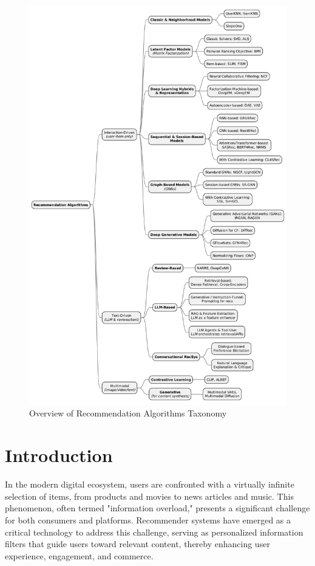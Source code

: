 \documentclass{article}
\begin{document}
    \begin{figure}[H]
        \centering
        \includegraphics[width=0.9\linewidth]{recommendation_algorithms.png}
        \caption{Overview of Recommendation Algorithms Taxonomy}
        \label{fig:recommendation_algorithms}
    \end{figure}

    \tableofcontents

    \section{Introduction}
    In the modern digital ecosystem, users are confronted with a virtually infinite selection of items, from products and movies to news articles and music. This phenomenon, often termed "information overload," presents a significant challenge for both consumers and platforms. Recommender systems have emerged as a critical technology to address this challenge, serving as personalized information filters that guide users toward relevant content, thereby enhancing user experience, engagement, and commerce.
\end{document}

